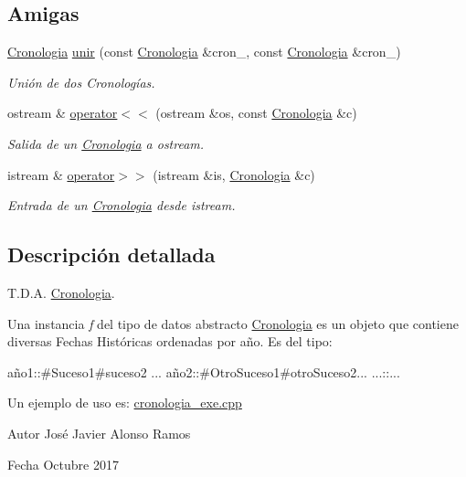 \subsection*{Amigas}
\begin{DoxyCompactItemize}
\item 
\hyperlink{classCronologia}{Cronologia} \hyperlink{classCronologia_a580622d3eaaa4c551dde62be88a4106e}{unir} (const \hyperlink{classCronologia}{Cronologia} \&cron\+\_, const \hyperlink{classCronologia}{Cronologia} \&cron\+\_)
\begin{DoxyCompactList}\small\item\em Unión de dos Cronologías. \end{DoxyCompactList}\item 
ostream \& \hyperlink{classCronologia_a5a590e2ec95cc4489c3de5b03e2cac4c}{operator$<$$<$} (ostream \&os, const \hyperlink{classCronologia}{Cronologia} \&c)
\begin{DoxyCompactList}\small\item\em Salida de un \hyperlink{classCronologia}{Cronologia} a ostream. \end{DoxyCompactList}\item 
istream \& \hyperlink{classCronologia_a6fa0f1131309b1cee355b9d8297ea33d}{operator$>$$>$} (istream \&is, \hyperlink{classCronologia}{Cronologia} \&c)
\begin{DoxyCompactList}\small\item\em Entrada de un \hyperlink{classCronologia}{Cronologia} desde istream. \end{DoxyCompactList}\end{DoxyCompactItemize}


\subsection{Descripción detallada}
T.\+D.\+A. \hyperlink{classCronologia}{Cronologia}. 

Una instancia {\itshape f} del tipo de datos abstracto {\ttfamily \hyperlink{classCronologia}{Cronologia}} es un objeto que contiene diversas Fechas Históricas ordenadas por año. Es del tipo\+:

año1\+:\+:\#\+Suceso1\#suceso2 ... año2\+:\+:\#\+Otro\+Suceso1\#otro\+Suceso2... ...\+:\+:...

Un ejemplo de uso es\+:  \hyperlink{cronologia__exe_8cpp}{cronologia\+\_\+exe.\+cpp}

\begin{DoxyAuthor}{Autor}
José Javier Alonso Ramos 
\end{DoxyAuthor}
\begin{DoxyDate}{Fecha}
Octubre 2017 
\end{DoxyDate}


